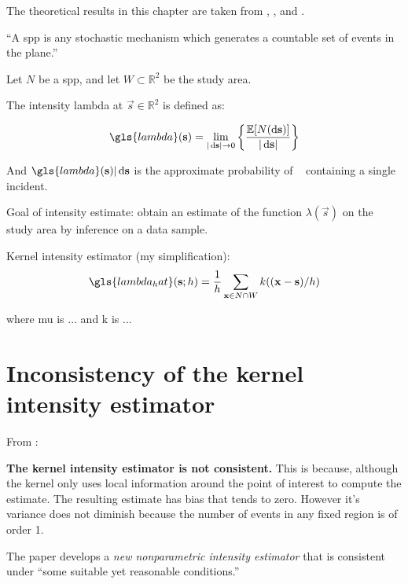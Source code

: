 


The theoretical results in this chapter are taken from \citet{diggle1988equivalence}, \citet{guan2008consistent}, and \citet{wand1994kernel}.

\begin{defn}
``A \gls{spp} is any stochastic mechanism which generates a countable set of events in the plane.''
\end{defn}

Let \(N\) be a \gls{spp}, and let \(W \subset \mathbb{R}^2 \) be the study area.

The intensity \gls{lambda} at \(\vec{s} \in \mathbb{R}^2\) is defined as:

\begin{equation}
\label{eq:lambda}
    \gls{lambda} (\vec{s}) = \lim_{|\ds| \to 0}
        \left\{
            \frac{\mathbb{E}[N(\ds)]}%
            {|\ds|}
        \right\}
\end{equation}

And \(\gls{lambda}(\vec{s})|\ds\) is the approximate probability of \ds~ containing a single incident.

Goal of intensity estimate: obtain an estimate of the function \(\lambda(\vec{s})\) on the study area by inference on a data sample.

Kernel intensity estimator (my simplification):
\begin{equation}
\label{eq:lambda_hat}
    \gls{lambda_hat}(\vec{s}; h) = \frac{1}{h} \sum_{\vec{x} \in N \cap W}{k((\vec{x}-\vec{s})/h)}
\end{equation}

where \gls{mu} is ... and \gls{k} is ...

\section{Inconsistency of the kernel intensity estimator}

From \citet{guan2008consistent}:

{
\color{red}
\textbf{The kernel intensity estimator is not consistent.}
This is because, although the kernel only uses local information around the point of interest to compute the estimate.
The resulting estimate has bias that tends to zero.
However it's variance does not diminish because the number of events in any fixed region is of order 1.
}

The paper develops a \textit{new nonparametric intensity estimator} that is consistent under ``some suitable yet reasonable conditions.''

